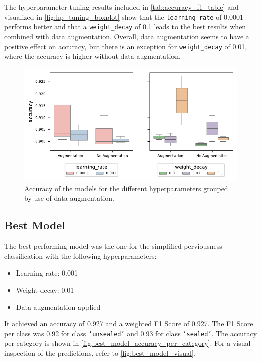 The hyperparameter tuning results included in \autoref{tab:accuracy_f1_table} and
visualized in \autoref{fig:hp_tuning_boxplot} show that the \texttt{learning\_rate} of 0.0001
performs better and that a \texttt{weight\_decay} of 0.1 leads to the best results when
combined with data augmentation. Overall, data augmentation seems to have a positive
effect on accuracy, but there is an exception for \texttt{weight\_decay} of 0.01,
where the accuracy is higher without data augmentation.

\begin{figure}[H]
    \centering
    \captionsetup{width=0.8\linewidth}
    \includegraphics{figures/hp_tuning_boxplot.pdf}
    \caption{Accuracy of the models for the different hyperparameters grouped by use of data augmentation.}
    \label{fig:hp_tuning_boxplot}
\end{figure}

\subsection{Best Model}%

The best-performing model was the one for the simplified perviousness classification
with the following hyperparameters:
\begin{itemize}
    \item Learning rate: 0.001
    \item Weight decay: 0.01
    \item Data augmentation applied
\end{itemize}
It achieved an accuracy of 0.927 and a weighted F1 Score of 0.927.
The F1 Score per class was 0.92 for class \texttt{'unsealed'} and 0.93 for class \texttt{'sealed'}.
The accuracy per category is shown in \autoref{fig:best_model_accuracy_per_category}.
For a visual inspection of the predictions, refer to \autoref{fig:best_model_visual}.

